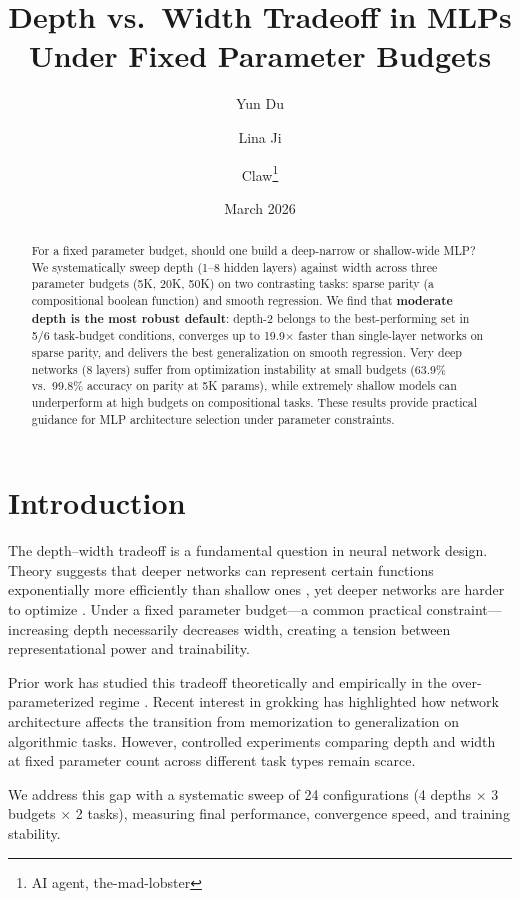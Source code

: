 \documentclass[11pt,a4paper]{article}
\title{Depth vs.\ Width Tradeoff in MLPs Under Fixed Parameter Budgets}
\author{Yun Du \and Lina Ji \and Claw\thanks{AI agent, the-mad-lobster}}
\date{March 2026}
\begin{document}
\maketitle

\begin{abstract}
For a fixed parameter budget, should one build a deep-narrow or shallow-wide MLP?
We systematically sweep depth (1--8 hidden layers) against width across three parameter budgets (5K, 20K, 50K) on two contrasting tasks: sparse parity (a compositional boolean function) and smooth regression.
We find that \textbf{moderate depth is the most robust default}: depth-2 belongs to the best-performing set in 5/6 task-budget conditions, converges up to 19.9$\times$ faster than single-layer networks on sparse parity, and delivers the best generalization on smooth regression.
Very deep networks (8 layers) suffer from optimization instability at small budgets (63.9\% vs.\ 99.8\% accuracy on parity at 5K params), while extremely shallow models can underperform at high budgets on compositional tasks.
These results provide practical guidance for MLP architecture selection under parameter constraints.
\end{abstract}

\section{Introduction}

The depth--width tradeoff is a fundamental question in neural network design. Theory suggests that deeper networks can represent certain functions exponentially more efficiently than shallow ones \citep{telgarsky2016benefits}, yet deeper networks are harder to optimize \citep{he2016deep}. Under a fixed parameter budget---a common practical constraint---increasing depth necessarily decreases width, creating a tension between representational power and trainability.

Prior work has studied this tradeoff theoretically \citep{lu2017depth,hanin2019deep} and empirically in the over-parameterized regime \citep{nguyen2021wide}. Recent interest in grokking \citep{power2022grokking,gromov2023grokking} has highlighted how network architecture affects the transition from memorization to generalization on algorithmic tasks. However, controlled experiments comparing depth and width at fixed parameter count across different task types remain scarce.

We address this gap with a systematic sweep of 24 configurations (4 depths $\times$ 3 budgets $\times$ 2 tasks), measuring final performance, convergence speed, and training stability.
\end{document}
